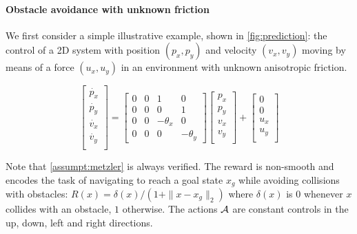 \paragraph{Obstacle avoidance with unknown friction}
We first consider a simple illustrative example, shown in \autoref{fig:prediction}: the control of a 2D system with position $(p_x,p_y)$ and velocity $(v_x, v_y)$ moving by means of a force $(u_x, u_y)$ in an environment with unknown anisotropic friction.

\begin{equation*}
\begin{bmatrix}
\dot{p_x}\\
\dot{p_y}\\
\dot{v_x}\\
\dot{v_y}\\
\end{bmatrix} = 
\begin{bmatrix}
0 & 0 & 1 & 0 \\
0 & 0 & 0 & 1 \\
0 & 0 & -\theta_x & 0 \\
0 & 0 & 0 & -\theta_y
\end{bmatrix}
\begin{bmatrix}
{p_x}\\
{p_y}\\
{v_x}\\
{v_y}\\
\end{bmatrix}
+
\begin{bmatrix}
0\\
0\\
{u_x}\\
{u_y}\\
\end{bmatrix}
\end{equation*}

Note that \autoref{assumpt:metzler} is always verified. The reward is non-smooth and encodes the task of navigating to reach a goal state $x_g$ while avoiding collisions with obstacles: $R(x) = \delta(x)/(1 + \|x - x_g\|_2)$  where $\delta(x)$ is $0$ whenever $x$ collides with an obstacle, $1$ otherwise. The actions $\mathcal{A}$ are constant controls in the up, down, left and right directions.

